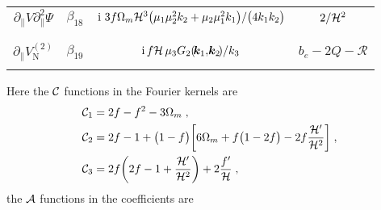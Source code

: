 \begin{landscape}
\begin{longtable}{| c | c | c | c |}
$\partial_{\parallel}V\partial^{2}_{\parallel}\Psi$ & $\beta_{18}$ & ${\mathrm{i\,}}\,3f\Omega_{m}\mathcal{H}^3{{\big(\mu_{1}\mu_{2}^{2}k_{2} +\mu_{2}\mu_{1}^{2}k_{1}\big) }/{\big(4k_{1}k_{2}\big)}}$ & ${2}/{\mathcal{H}^{2}}$ \\ 
&  &  & \\
\hline 
&  &  & \\
$\partial_{\parallel}{V_{\mathrm{N}}^{(2)}}$& $\beta_{19}$ & $\mathrm{i}\,f\mathcal{H} \,{\mu_{3}}G_{2}(\!\bm{k}_{1},\!\bm{k}_{2}\!)/{k_{3}}$ & $b_{e}-2Q-\mathcal{R}$ \\
&  &  & \\ 
\hline
\end{longtable}
\end{landscape}

\noindent Here the ${\cal C}$ functions in the Fourier kernels are
\begin{align}
{\mathcal{C}_{1}} &= 2f - f^2 -3\Omega_m\;, \label{e7} \\
\mathcal{C}_{2} &= 2f-1+ \big(1-f\big)\bigg[6\Omega_m + f\big(1-2f\big) - 2f\frac{\mathcal{H}'}{\mathcal{H}^{2}}\bigg] \;, \label{e10} \\
\mathcal{C}_{3} &= 2 f\bigg(2f-1+\frac{\mathcal{H}'}{\mathcal{H}^{2}}\bigg) +2 \frac{f'}{\mathcal{H}}\;, \label{e12} 
\end{align}
the 
${\cal A}$ functions in the coefficients are 
